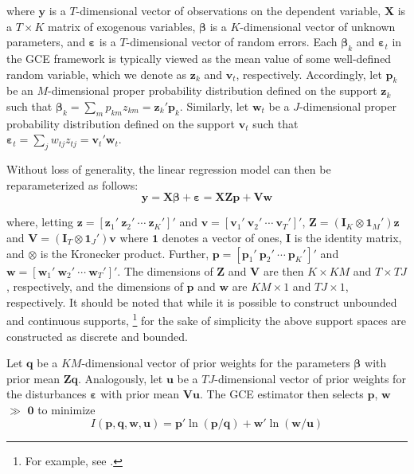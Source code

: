 \documentclass[english]{article}
\begin{document}
\noindent
where $\mathbf{y}$ is a $T$-dimensional vector of observations on the 
dependent variable, $\mathbf{X}$ is a $T\times K$ matrix of exogenous
variables, $\mathbf{\beta}$ is a $K$-dimensional vector of unknown 
parameters, and $\mathbf{\varepsilon}$ is a $T$-dimensional vector of 
random errors.
Each $\mathbf{\beta}_k$ and $\mathbf{\varepsilon}_t$ in the GCE 
framework is typically viewed as the mean value of some well-defined 
random variable, which we denote as $\mathbf{z}_k$ and $\mathbf{v}_t$, 
respectively.
Accordingly, let $\mathbf{p}_k$ be an $M$-dimensional proper 
probability distribution defined on the support $\mathbf{z}_k$ such that 
$\mathbf{\beta}_k = \sum_m p_{km}z_{km} = \mathbf{z}_k' 
\mathbf{p}_k$.
Similarly, let $\mathbf{w}_t$ be a $J$-dimensional proper probability 
distribution defined on the support $\mathbf{v}_t$ such that  
$\mathbf{\varepsilon}_t = \sum_j w_{tj}z_{tj} = \mathbf{v}_t' 
\mathbf{w}_t$.

Without loss of generality, the linear regression model can then be 
reparameterized as follows:
\begin{equation}
\mathbf{y} = \mathbf{X\beta} + \mathbf{\varepsilon} = 
\mathbf{X Z p} + \mathbf{V w}
\end{equation}

\noindent
where, letting $\mathbf{z}=[\mathbf{z}_1' ~ \mathbf{z}_2' ~ \cdots ~ 
\mathbf{z}_K' ]'$ and $\mathbf{v}=[\mathbf{v}_1' ~ \mathbf{v}_2' ~ 
\cdots ~ \mathbf{v}_T' ]'$, 
$\mathbf{Z}= (\mathbf{I}_K \otimes \mathbf{1}_M')\mathbf{z}$ and
$\mathbf{V}= (\mathbf{I}_T \otimes \mathbf{1}_J')\mathbf{v}$
where $\mathbf{1}$ denotes a vector of ones, $\mathbf{I}$ is the 
identity matrix, and $\otimes$ is the Kronecker product.
Further, $\mathbf{p} = [\mathbf{p}_1' ~ \mathbf{p}_2' ~ \cdots ~ 
\mathbf{p}_K' ]'$ and $\mathbf{w} = [\mathbf{w}_1' ~ \mathbf{w}_2' 
~ \cdots ~ \mathbf{w}_T' ]'$.
The dimensions of $\mathbf{Z}$ and $\mathbf{V}$ are then 
$K \times KM$ and $T \times TJ$, respectively, and the dimensions of 
$\mathbf{p}$ and $\mathbf{w}$ are $KM \times 1$ and $TJ \times 1$, 
respectively.
It should be noted that while it is possible to construct unbounded and 
continuous supports,%
\footnote{For example, see \citet{golan2002}.}
for the sake of simplicity the above support spaces are constructed as 
discrete and bounded. 

Let $\mathbf{q}$ be a $KM$-dimensional vector of prior weights for the 
parameters $\mathbf{\beta}$ with prior mean $\mathbf{Zq}$.
Analogously, let $\mathbf{u}$ be a $TJ$-dimensional vector of prior weights 
for the disturbances $\mathbf{\varepsilon}$ with prior mean $\mathbf{Vu}$.
The GCE estimator then selects $\mathbf{p}$, $\mathbf{w}$ $\gg$ 
$\mathbf{0}$ to minimize 
\begin{equation}
I({\mathbf{p}, \mathbf{q}, \mathbf{w}, \mathbf{u}}) = 
\mathbf{p}' \ln (\mathbf{p}/\mathbf{q}) + 
\mathbf{w}' \ln (\mathbf{w}/\mathbf{u})
\label{eq: ce}
\end{equation}
\end{document}

